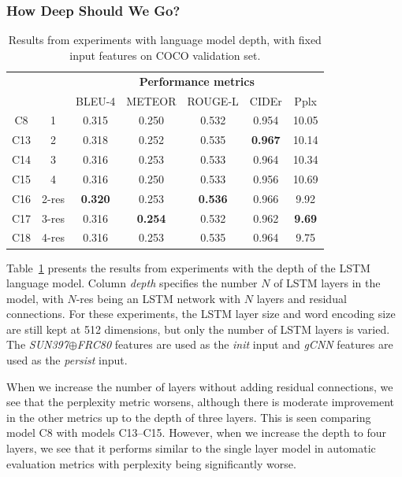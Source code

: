 \subsubsection{How Deep Should We Go?}
\label{subsec:exptdepth}
\begin{table}[tbh]
  \centering
  \newcommand{\bs}{\small}
  \begin{adjustbox}{center}
  \begin{tabular}{|c|c|c|c|c|c|c|}
    \hline
    \bf \multirow{2}{*}{\#} & \bf \multirow{2}{*}{Depth} & \multicolumn{5}{c|}{\bf Performance metrics}\\
    \cline{3-7}
    \bf &\bf &\bs BLEU-4 &\bs METEOR &\bs ROUGE-L &\bs CIDEr&\bs Pplx \\\hline
    C8  & 1   & 0.315 & 0.250 & 0.532 & 0.954 &10.05  \\\hline
    C13 & 2   & 0.318 & 0.252 & 0.535 &\bf0.967 & 10.14  \\
    C14 & 3   & 0.316 & 0.253 & 0.533 & 0.964   & 10.34  \\
    C15 & 4   & 0.316 & 0.250 & 0.533 & 0.956 & 10.69  \\\hline
    C16 &2-res&\bf0.320& 0.253 &\bf0.536&0.966  & 9.92   \\
    C17 &3-res& 0.316 &\bf0.254&0.532 & 0.962   &\bf9.69 \\
    C18 &4-res& 0.316 & 0.253 & 0.535 & 0.964   & 9.75 \\\hline
  \end{tabular}
  \end{adjustbox}
  \caption{Results from experiments with language model depth, with fixed input features on COCO validation set.}
  \label{tab:resCocDepthExpt}
\end{table}

Table~\ref{tab:resCocDepthExpt} presents the results from experiments with the
depth of the LSTM language model.
Column \emph{depth} specifies the number $N$ of LSTM layers in the model,
with $N$-res being an LSTM network with $N$ layers and residual connections.
For these experiments, the LSTM layer size and word encoding size are still kept
at 512 dimensions, but only the number of LSTM layers is varied.
The \emph{SUN397$\oplus$FRC80} features are used as the \emph{init} input and
\emph{gCNN} features are used as the \emph{persist} input.

When we increase the number of layers without adding residual connections, we
see that the perplexity metric worsens, although there is moderate improvement
in the other metrics up to the depth of three layers.
This is seen comparing model C8 with models C13--C15.
However, when we increase the depth to four layers, we see that it performs similar to
the single layer model in automatic evaluation metrics with perplexity being
significantly worse.

